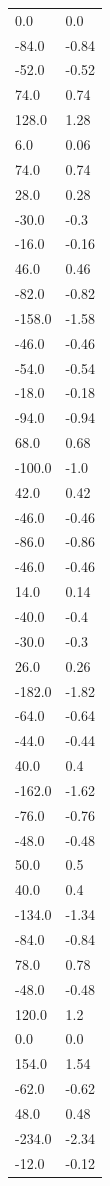 \begin{longtable}{ll}
0.0 & 0.0 \\
-84.0 & -0.84 \\
-52.0 & -0.52 \\
74.0 & 0.74 \\
128.0 & 1.28 \\
6.0 & 0.06 \\
74.0 & 0.74 \\
28.0 & 0.28 \\
-30.0 & -0.3 \\
-16.0 & -0.16 \\
46.0 & 0.46 \\
-82.0 & -0.82 \\
-158.0 & -1.58 \\
-46.0 & -0.46 \\
-54.0 & -0.54 \\
-18.0 & -0.18 \\
-94.0 & -0.94 \\
68.0 & 0.68 \\
-100.0 & -1.0 \\
42.0 & 0.42 \\
-46.0 & -0.46 \\
-86.0 & -0.86 \\
-46.0 & -0.46 \\
14.0 & 0.14 \\
-40.0 & -0.4 \\
-30.0 & -0.3 \\
26.0 & 0.26 \\
-182.0 & -1.82 \\
-64.0 & -0.64 \\
-44.0 & -0.44 \\
40.0 & 0.4 \\
-162.0 & -1.62 \\
-76.0 & -0.76 \\
-48.0 & -0.48 \\
50.0 & 0.5 \\
40.0 & 0.4 \\
-134.0 & -1.34 \\
-84.0 & -0.84 \\
78.0 & 0.78 \\
-48.0 & -0.48 \\
120.0 & 1.2 \\
0.0 & 0.0 \\
154.0 & 1.54 \\
-62.0 & -0.62 \\
48.0 & 0.48 \\
-234.0 & -2.34 \\
-12.0 & -0.12 \\

\end{longtable}
